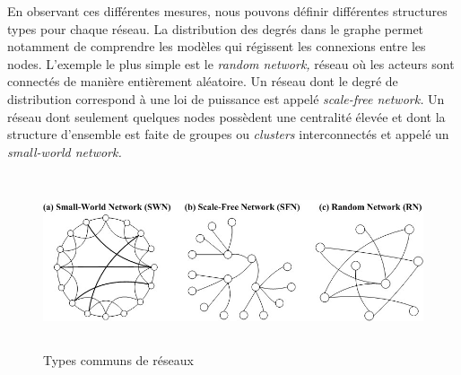 En observant ces diff\'erentes mesures, nous pouvons d\'efinir
diff\'erentes structures types pour chaque r\'eseau. La distribution
des degr\'es dans le graphe permet notamment de comprendre les
mod\`eles qui r\'egissent les connexions entre les nodes.
L{\textquoteright}exemple le plus simple est le \textit{random network,
}r\'eseau o\`u les acteurs sont connect\'es de mani\`ere enti\`erement
al\'eatoire. Un r\'eseau dont le degr\'e de distribution correspond \`a
une loi de puissance est appel\'e \textit{scale-free network. }Un
r\'eseau dont seulement quelques nodes poss\`edent une centralit\'e
\'elev\'ee et dont la structure d{\textquoteright}ensemble est faite de
groupes ou \textit{clusters} interconnect\'es et appel\'e un
\textit{small-world network. }


\begin{figure}
    \centering
    \includegraphics[width=6.3449in,height=2.0224in]{figures/chap3/chapitre3-img4.jpg}
    \caption{Types communs de r\'eseaux}
\end{figure}


